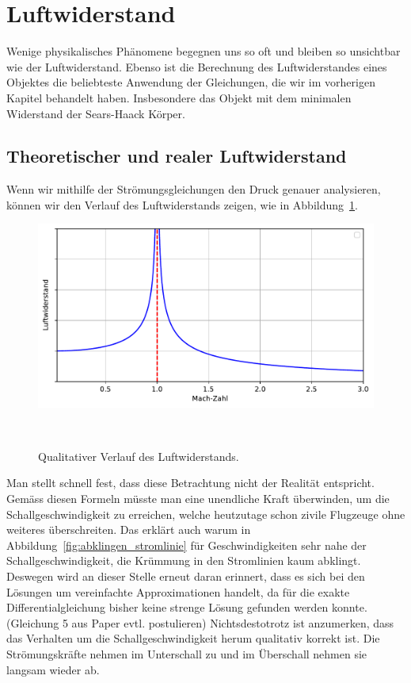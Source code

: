 %
%
%
%
\section{Luftwiderstand\label{ueberschall:section:Luftwiderstand}}
Wenige physikalisches Phänomene begegnen uns so oft und bleiben
so unsichtbar wie der Luftwiderstand.
Ebenso ist die Berechnung des Luftwiderstandes eines Objektes die beliebteste
Anwendung der Gleichungen, die wir im vorherigen Kapitel behandelt haben.
Insbesondere das Objekt mit dem minimalen Widerstand der Sears-Haack Körper.

\subsection{Theoretischer und realer Luftwiderstand}
Wenn wir mithilfe der Strömungsgleichungen den Druck genauer analysieren,
können wir den Verlauf des Luftwiderstands zeigen, 
wie in Abbildung~\ref{fig:luftwiderstand}.
\begin{figure}
    \centering
    \includegraphics[width=\textwidth]{papers/ueberschall/figures/Luftwiderstand_qual.pdf}
    \caption{Qualitativer Verlauf des Luftwiderstands.}
    ~\label{fig:luftwiderstand}
\end{figure}
Man stellt schnell fest, dass diese Betrachtung nicht der Realität
entspricht.
Gemäss diesen Formeln müsste man eine unendliche Kraft überwinden,
um die Schallgeschwindigkeit zu erreichen, 
welche heutzutage schon zivile Flugzeuge ohne weiteres überschreiten.
Das erklärt auch warum in Abbildung~\ref{fig:abklingen_stromlinie}
für Geschwindigkeiten sehr nahe der Schallgeschwindigkeit, die Krümmung in 
den Stromlinien kaum abklingt.
Deswegen wird an dieser Stelle erneut daran erinnert, dass es sich bei den Lösungen
um vereinfachte Approximationen handelt, da für die exakte Differentialgleichung
bisher keine strenge Lösung gefunden werden konnte.
(Gleichung 5 aus Paper evtl. postulieren)
Nichtsdestotrotz ist anzumerken, dass das Verhalten
um die Schallgeschwindigkeit herum qualitativ korrekt ist.
Die Strömungskräfte nehmen im Unterschall zu und im Überschall
nehmen sie langsam wieder ab.

